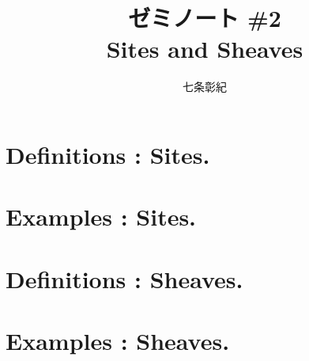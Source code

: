 \documentclass[a4paper]{jsarticle}
\begin{document}
\title{ゼミノート \#2 \\ Sites and Sheaves}
\author{七条彰紀}
\maketitle

\section{Definitions : Sites.}

\section{Examples : Sites.}

\section{Definitions : Sheaves.}
\section{Examples : Sheaves.}



\end{document}

